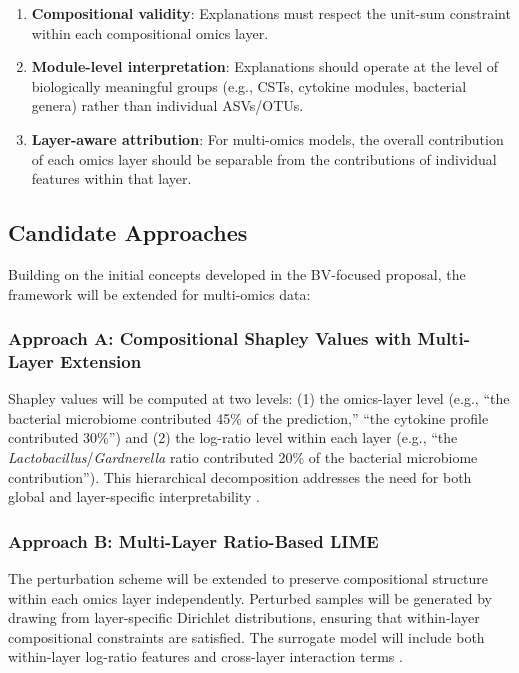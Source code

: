 \documentclass[12pt,a4paper]{report}
\begin{document}
\begin{enumerate}
    \item \textbf{Compositional validity}: Explanations must respect the unit-sum constraint within each compositional omics layer.
    \item \textbf{Module-level interpretation}: Explanations should operate at the level of biologically meaningful groups (e.g., CSTs, cytokine modules, bacterial genera) rather than individual ASVs/OTUs.
    \item \textbf{Layer-aware attribution}: For multi-omics models, the overall contribution of each omics layer should be separable from the contributions of individual features within that layer.
\end{enumerate}

\subsection{Candidate Approaches}

Building on the initial concepts developed in the BV-focused proposal, the framework will be extended for multi-omics data:

\subsubsection{Approach A: Compositional Shapley Values with Multi-Layer Extension}

Shapley values will be computed at two levels: (1) the omics-layer level (e.g., ``the bacterial microbiome contributed 45\% of the prediction,'' ``the cytokine profile contributed 30\%'') and (2) the log-ratio level within each layer (e.g., ``the \textit{Lactobacillus}/\textit{Gardnerella} ratio contributed 20\% of the bacterial microbiome contribution''). This hierarchical decomposition addresses the need for both global and layer-specific interpretability \cite{lundberg2017unified, quinzan2024learning}.

\subsubsection{Approach B: Multi-Layer Ratio-Based LIME}

The perturbation scheme will be extended to preserve compositional structure within each omics layer independently. Perturbed samples will be generated by drawing from layer-specific Dirichlet distributions, ensuring that within-layer compositional constraints are satisfied. The surrogate model will include both within-layer log-ratio features and cross-layer interaction terms \cite{ribeiro2016why}.
\end{document}
